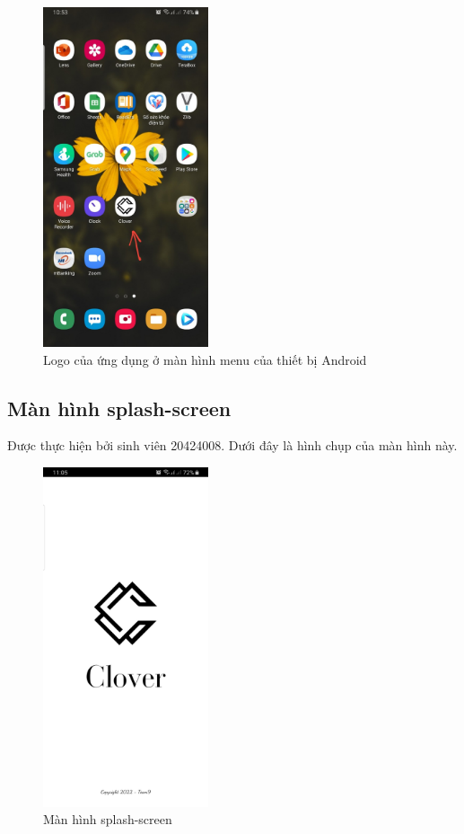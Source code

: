 \documentclass[12pt]{article}
\begin{document}
\begin{figure}[H]
    \centering
    \includegraphics[height=10cm]{images/04.png}
    \caption{Logo của ứng dụng ở màn hình menu của thiết bị Android}
\end{figure}

\newpage
\subsection{Màn hình splash-screen}
Được thực hiện bởi sinh viên 20424008. Dưới đây là hình chụp của màn hình này.

\begin{figure}[H]
    \centering
    \includegraphics[height=10cm]{images/05.png}
    \caption{Màn hình splash-screen}
\end{figure}
\end{document}
